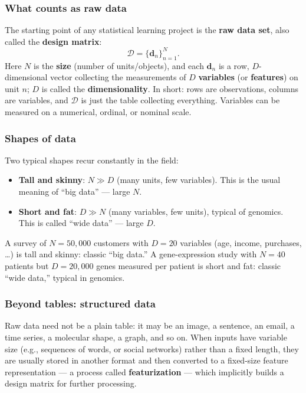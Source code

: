 \subsubsection{What counts as raw data}

The starting point of any statistical learning project is the \textbf{raw data set}, also called the \textbf{design matrix}:
\[
  \mathcal{D} = \{\mathbf{d}_n\}_{n=1}^{N}.
\]
Here $N$ is the \textbf{size} (number of units/objects), and each $\mathbf{d}_n$ is a row, $D$-dimensional vector collecting the measurements of $D$ \textbf{variables} (or \textbf{features}) on unit $n$; $D$ is called the \textbf{dimensionality}. In short: rows are observations, columns are variables, and $\mathcal{D}$ is just the table collecting everything. Variables can be measured on a numerical, ordinal, or nominal scale.

\subsubsection{Shapes of data}

Two typical shapes recur constantly in the field:
\begin{itemize}
  \item \textbf{Tall and skinny}: $N \gg D$ (many units, few variables). This is the usual meaning of ``big data'' --- large $N$.
  \item \textbf{Short and fat}: $D \gg N$ (many variables, few units), typical of genomics. This is called ``wide data'' --- large $D$.
\end{itemize}

\begin{example}
A survey of $N = 50{,}000$ customers with $D = 20$ variables (age, income, purchases, \ldots) is tall and skinny: classic ``big data.'' A gene-expression study with $N = 40$ patients but $D = 20{,}000$ genes measured per patient is short and fat: classic ``wide data,'' typical in genomics.
\end{example}

\subsubsection{Beyond tables: structured data}

Raw data need not be a plain table: it may be an image, a sentence, an email, a time series, a molecular shape, a graph, and so on. When inputs have variable size (e.g., sequences of words, or social networks) rather than a fixed length, they are usually stored in another format and then converted to a fixed-size feature representation --- a process called \textbf{featurization} --- which implicitly builds a design matrix for further processing.

